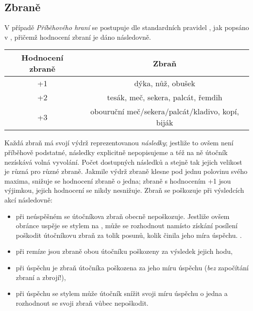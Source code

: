\documentclass[../main.tex]{subfiles}
\begin{document}
\subsection{Zbraně}
\label{sec:zbraně}

V případě \emph{Příběhového hraní} se postupuje dle standardních pravidel , jak popsáno v , přičemž hodnocení zbraní je dáno následovně.


\begin{table}[h]  
\centering
\begin{tabular}[h]{c|c}
Hodnocení zbraně & Zbraň \\ \hline
+1 & dýka, nůž, obušek \\
+2 & tesák, meč, sekera, palcát, řemdih \\
+3 & obouruční meč/sekera/palcát/kladivo, kopí, biják\\
\end{tabular}
\end{table}

\begin{Real}[Zbraně]
	Každá zbraň má svojí výdrž reprezentovanou \emph{následky}; jestliže to ovšem není příběhově podstatné, následky explicitně nepopisujeme a též na ně útočník nezískává volná vyvolání. Počet dostupných následků a stejně tak jejich velikost je různá pro různé zbraně. Jakmile výdrž zbraně klesne pod jednu polovinu svého maxima, snižuje se hodnocení zbraně o jedna; zbraně s hodnocením +1 jsou výjimkou, jejich hodnocení se nikdy nesnižuje. Zbraň se poškozuje při výsledcích akcí následovně:
	\begin{itemize}
		\item při neúspěšném  se útočníkova zbraň obecně nepoškozuje. Jestliže ovšem obránce uspěje se stylem na , může se rozhodnout namísto získání posílení poškodit útočníkovu zbraň za tolik posunů, kolik činila jeho míra úspěchu. \leavevmode{}.
		\item při remíze jsou zbraně obou útočníku poškozeny za výsledek jejich hodu,
		\item při úspěchu je zbraň útočníka poškozena za jeho míru úspěchu (\emph{bez} započítání zbraní a zbrojí!),
		\item při úspěchu se stylem může útočník snížit svoji míru úspěchu o jedna a rozhodnout se svoji zbraň vůbec nepoškodit. \leavevmode{}
	\end{itemize}
\end{Real}
\end{document}
